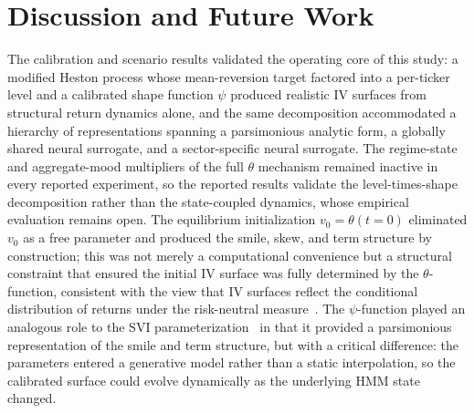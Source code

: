 \section{Discussion and Future Work}\label{sec:discussion}

The calibration and scenario results validated the operating core of this study: a modified Heston process whose mean-reversion target factored into a per-ticker level and a calibrated shape function $\psi$ produced realistic IV surfaces from structural return dynamics alone, and the same decomposition accommodated a hierarchy of representations spanning a parsimonious analytic form, a globally shared neural surrogate, and a sector-specific neural surrogate. The regime-state and aggregate-mood multipliers of the full $\theta$ mechanism remained inactive in every reported experiment, so the reported results validate the level-times-shape decomposition rather than the state-coupled dynamics, whose empirical evaluation remains open. The equilibrium initialization $v_0 = \theta(t\!=\!0)$ eliminated $v_0$ as a free parameter and produced the smile, skew, and term structure by construction; this was not merely a computational convenience but a structural constraint that ensured the initial IV surface was fully determined by the $\theta$-function, consistent with the view that IV surfaces reflect the conditional distribution of returns under the risk-neutral measure~\cite{cont2002}. The $\psi$-function played an analogous role to the SVI parameterization~\cite{gatheral2004} in that it provided a parsimonious representation of the smile and term structure, but with a critical difference: the parameters entered a generative model rather than a static interpolation, so the calibrated surface could evolve dynamically as the underlying HMM state changed.

